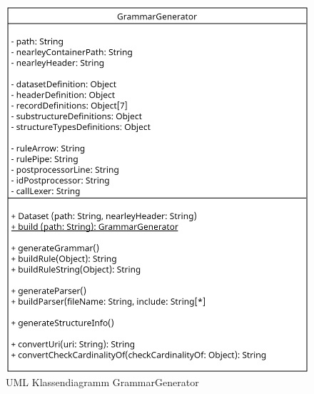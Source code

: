 \begin{figure}[h]
	\centering
	\includegraphics[width=1\textwidth]{images/UML_Class_GrammarGenerator.png}
	\caption{UML Klassendiagramm GrammarGenerator}
	\label{fig: UML Klassendiagramm GrammarGenerator}
\end{figure}


